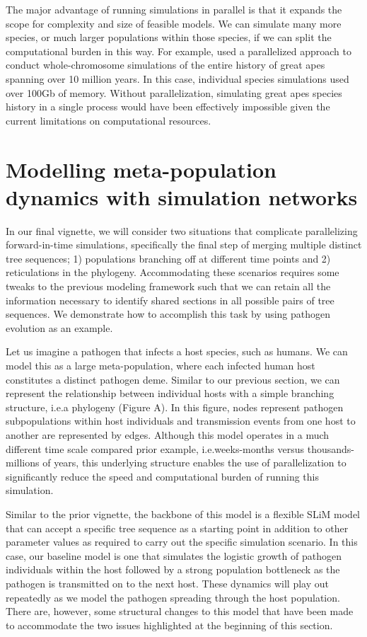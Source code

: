 \documentclass[12pt]{article}
\newcommand*{\ie}{i.e.\xcomma}
\begin{document}
The major advantage of running simulations in parallel is that it expands the scope for complexity and size of feasible models. We can simulate many more species, or much larger
populations within those species, if we can split the computational burden in this way. For example, \citet{rodrigues2024shared} used a parallelized approach to conduct
whole-chromosome simulations of the entire history of great apes spanning over 10 million years. In this case, individual species simulations used over 100Gb of memory. Without
parallelization, simulating great apes species history in a single process would have been effectively impossible given the current limitations on computational resources.

\section*{Modelling meta-population dynamics with simulation networks}

In our final vignette, we will consider two situations that complicate parallelizing forward-in-time simulations, specifically the final step of merging multiple distinct tree sequences;
1) populations branching off at different time points and 2) reticulations in the phylogeny. Accommodating these scenarios requires some tweaks to the previous modeling
framework such that we can retain all the information necessary to identify shared sections in all possible pairs of tree sequences. We demonstrate how to accomplish this task
by using pathogen evolution as an example.

Let us imagine a pathogen that infects a host species, such as humans. We can model this as a large meta-population, where each infected human host constitutes a distinct
pathogen deme. Similar to our previous section, we can represent the relationship between individual hosts with a simple branching structure, \ie a phylogeny (Figure A). In %
this figure, nodes represent pathogen subpopulations within host individuals and transmission events from one host to another are represented by edges. Although this model
operates in a much different time scale compared prior example, \ie weeks-months versus thousands-millions of years, this underlying structure enables the use of parallelization
to significantly reduce the speed and computational burden of running this simulation.

Similar to the prior vignette, the backbone of this model is a flexible SLiM model that can accept a specific tree sequence as a starting point in addition to other
parameter values as required to carry out the specific simulation scenario. In this case, our baseline model is one that simulates the logistic growth of pathogen individuals
within the host followed by a strong population bottleneck as the pathogen is transmitted on to the next host. These dynamics will play out repeatedly as we model the pathogen
spreading through the host population. There are, however, some structural changes to this model that have been made to accommodate the two issues highlighted at the
beginning of this section.
\end{document}
